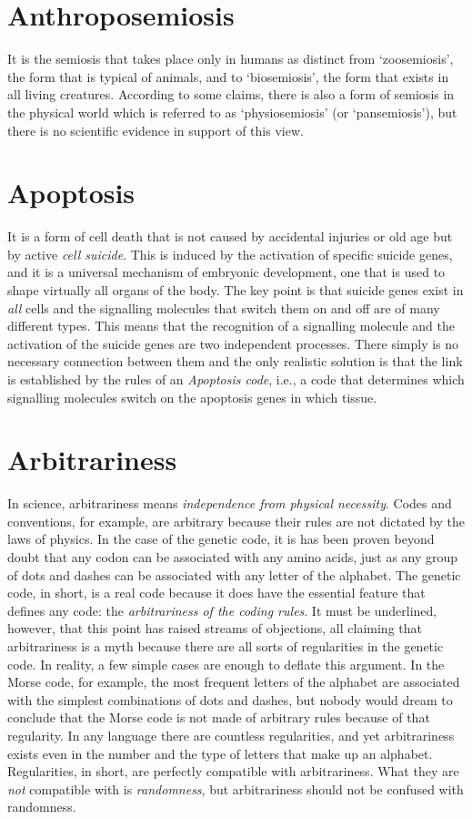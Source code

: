 \documentclass[12pt]{article}
\begin{document}
 
\section{Anthroposemiosis }
It is the semiosis that takes place only in humans as distinct from `zoosemiosis', the form that is typical of animals, and to `biosemiosis', the form that exists in all living creatures. According to some claims, there is also a form of semiosis in the physical world which is referred to as `physiosemiosis' (or `pansemiosis'), but there is no scientific evidence in support of this view.


\section{Apoptosis}
It is a form of cell death that is not caused by accidental injuries or old age but by active \textit{cell suicide}. This is induced by the activation of specific suicide genes, and it is a universal mechanism of embryonic development, one that is used to shape virtually all organs of the body. The key point is that suicide genes exist in \textit{all} cells and the signalling molecules that switch them on and off are of many different types. This means that the recognition of a signalling molecule and the activation of the suicide genes are two independent processes. There simply is no necessary connection between them and the only realistic solution is that the link is established by the rules of an \textit{Apoptosis code}, i.e., a code that determines which signalling molecules switch on the apoptosis genes in which tissue.


\section{Arbitrariness}
In science, arbitrariness means \textit{independence from physical necessity}. Codes and conventions, for example, are arbitrary because their rules are not dictated by the laws of physics. In the case of the genetic code, it is has been proven beyond doubt that any codon can be associated with any amino acids, just as any group of dots and dashes can be associated with any letter of the alphabet. The genetic code, in short, is a real code because it does have the essential feature that defines any code: the \textit{arbitrariness of the coding rules}. It must be underlined, however, that this point has raised streams of objections, all claiming that arbitrariness is a myth because there are all sorts of regularities in the genetic code. In reality, a few simple cases are enough to deflate this argument. In the Morse code, for example, the most frequent letters of the alphabet are associated with the simplest combinations of dots and dashes, but nobody would dream to conclude that the Morse code is not made of arbitrary rules because of that regularity. In any language there are countless regularities, and yet arbitrariness exists even in the number and the type of letters that make up an alphabet. Regularities, in short, are perfectly compatible with arbitrariness. What they are \textit{not} compatible with is \textit{randomness}, but arbitrariness should not be confused with randomness.
\end{document}

